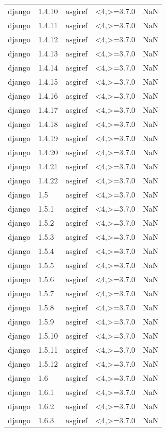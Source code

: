 \begin{tabular}{llllr}
django & 1.4.10 & asgiref & <4,>=3.7.0 & NaN \\
django & 1.4.11 & asgiref & <4,>=3.7.0 & NaN \\
django & 1.4.12 & asgiref & <4,>=3.7.0 & NaN \\
django & 1.4.13 & asgiref & <4,>=3.7.0 & NaN \\
django & 1.4.14 & asgiref & <4,>=3.7.0 & NaN \\
django & 1.4.15 & asgiref & <4,>=3.7.0 & NaN \\
django & 1.4.16 & asgiref & <4,>=3.7.0 & NaN \\
django & 1.4.17 & asgiref & <4,>=3.7.0 & NaN \\
django & 1.4.18 & asgiref & <4,>=3.7.0 & NaN \\
django & 1.4.19 & asgiref & <4,>=3.7.0 & NaN \\
django & 1.4.20 & asgiref & <4,>=3.7.0 & NaN \\
django & 1.4.21 & asgiref & <4,>=3.7.0 & NaN \\
django & 1.4.22 & asgiref & <4,>=3.7.0 & NaN \\
django & 1.5 & asgiref & <4,>=3.7.0 & NaN \\
django & 1.5.1 & asgiref & <4,>=3.7.0 & NaN \\
django & 1.5.2 & asgiref & <4,>=3.7.0 & NaN \\
django & 1.5.3 & asgiref & <4,>=3.7.0 & NaN \\
django & 1.5.4 & asgiref & <4,>=3.7.0 & NaN \\
django & 1.5.5 & asgiref & <4,>=3.7.0 & NaN \\
django & 1.5.6 & asgiref & <4,>=3.7.0 & NaN \\
django & 1.5.7 & asgiref & <4,>=3.7.0 & NaN \\
django & 1.5.8 & asgiref & <4,>=3.7.0 & NaN \\
django & 1.5.9 & asgiref & <4,>=3.7.0 & NaN \\
django & 1.5.10 & asgiref & <4,>=3.7.0 & NaN \\
django & 1.5.11 & asgiref & <4,>=3.7.0 & NaN \\
django & 1.5.12 & asgiref & <4,>=3.7.0 & NaN \\
django & 1.6 & asgiref & <4,>=3.7.0 & NaN \\
django & 1.6.1 & asgiref & <4,>=3.7.0 & NaN \\
django & 1.6.2 & asgiref & <4,>=3.7.0 & NaN \\
django & 1.6.3 & asgiref & <4,>=3.7.0 & NaN \\

\end{tabular}
